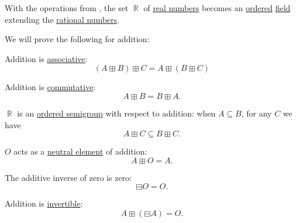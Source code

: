 \begin{proposition}\label{thm:field_of_real_numbers}
  With the operations from , the set \( \BbbR \) of \hyperref[def:real_numbers]{real numbers} becomes an \hyperref[def:ordered_semiring]{ordered} \hyperref[def:field]{field} extending the \hyperref[def:rational_numbers]{rational numbers}.

  We will prove the following for addition:
  \begin{thmenum}[series=thm:field_of_real_numbers]
     Addition is \hyperref[def:binary_operation/associative]{associative}:
    \begin{equation}\label{eq:thm:field_of_real_numbers/addition_associative}
      (A \boxplus B) \boxplus C = A \boxplus (B \boxplus C)
    \end{equation}

     Addition is \hyperref[def:binary_operation/commutative]{commutative}:
    \begin{equation}\label{eq:thm:field_of_real_numbers/addition_commutative}
      A \boxplus B = B \boxplus A.
    \end{equation}

     \( \BbbR \) is an \hyperref[def:ordered_semigroup]{ordered semigroup} with respect to addition: when \( A \subseteq B \), for any \( C \) we have
    \begin{equation}\label{eq:thm:field_of_real_numbers/addition_order}
      A \boxplus C \subseteq B \boxplus C.
    \end{equation}

      \( O \) acts as a \hyperref[def:monoid]{neutral element} of addition:
    \begin{equation}\label{eq:thm:field_of_real_numbers/addition_neutral}
      A \boxplus O = A.
    \end{equation}

     The additive inverse of zero is zero:
    \begin{equation}\label{eq:thm:field_of_real_numbers/zero_additive_inverse}
      \boxminus O = O.
    \end{equation}

     Addition is \hyperref[def:monoid_inverse]{invertible}:
    \begin{equation}\label{eq:thm:field_of_real_numbers/addition_inverse}
      A \boxplus (\boxminus A) = O.
    \end{equation}


\end{thmenum}
\end{proposition}
